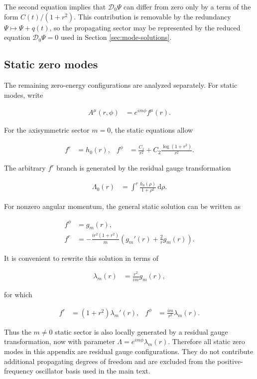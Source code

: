 The second equation implies that $\mathcal{D}_{0}\Psi$ can differ from zero only by a term of the form $C(t)/(1+r^{2})$. This contribution is removable by the redundancy $\Psi\mapsto\Psi+q(t)$, so the propagating sector may be represented by the reduced equation $\mathcal{D}_{0}\Psi=0$ used in Section \ref{sec:mode-solutions}.

\subsection{Static zero modes}\label{subsec:app-static-modes}

The remaining zero-energy configurations are analyzed separately. For static modes, write

\begin{align}
A^{\mu}(r,\phi)&=e^{im\phi}f^{\mu}(r).
\end{align}

For the axisymmetric sector $m=0$, the static equations allow

\begin{align}
f^{r}&=h_{0}(r), &
f^{\phi}&=\frac{C_{1}}{r^{2}}+C_{2}\frac{\log(1+r^{2})}{r^{2}}.
\end{align}

The arbitrary $f^{r}$ branch is generated by the residual gauge transformation

\begin{align}
\Lambda_{0}(r)&=\int^{r}\frac{h_{0}(\rho)}{1+\rho^{2}}\,\mathrm{d}\rho.
\end{align}

For nonzero angular momentum, the general static solution can be written as

\begin{align}
f^{\phi}&=g_{m}(r), \\
f^{r}&=-\frac{ir^{2}(1+r^{2})}{m}\left(g_{m}'(r)+\frac{2}{r}g_{m}(r)\right).
\end{align}

It is convenient to rewrite this solution in terms of

\begin{align}
\lambda_{m}(r)&=\frac{r^{2}}{im}g_{m}(r),
\end{align}

for which

\begin{align}
f^{r}&=(1+r^{2})\lambda_{m}'(r), &
f^{\phi}&=\frac{im}{r^{2}}\lambda_{m}(r).
\end{align}

Thus the $m\neq0$ static sector is also locally generated by a residual gauge transformation, now with parameter $\Lambda=e^{im\phi}\lambda_{m}(r)$. Therefore all static zero modes in this appendix are residual gauge configurations. They do not contribute additional propagating degrees of freedom and are excluded from the positive-frequency oscillator basis used in the main text.
